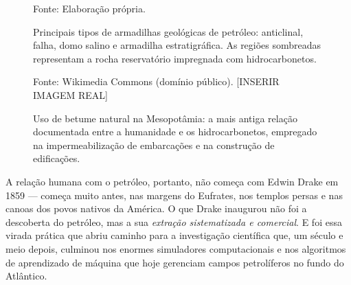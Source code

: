 \documentclass[
  12pt,
  a4paper,
  oneside,
  brazilian,
  sumario=tradicional
]{abntex2}
\renewcommand{\fonte}[1]{\vspace{2pt}\par\noindent\footnotesize Fonte: #1}
\begin{document}
\begin{figure}[H]
  \caption{Principais tipos de armadilhas geológicas de petróleo: anticlinal, falha, domo salino e armadilha estratigráfica. As regiões sombreadas representam a rocha reservatório impregnada com hidrocarbonetos.}
  \label{fig:armadilhas}
  \fonte{Elaboração própria.}
\end{figure}

\begin{figure}[H]
  \centering
  \caption{Uso de betume natural na Mesopotâmia: a mais antiga relação documentada entre a humanidade e os hidrocarbonetos, empregado na impermeabilização de embarcações e na construção de edificações.}
  \label{fig:betume}
  \fonte{Wikimedia Commons (domínio público). [INSERIR IMAGEM REAL]}
\end{figure}

A relação humana com o petróleo, portanto, não começa com Edwin Drake
em 1859 — começa muito antes, nas margens do Eufrates, nos templos
persas e nas canoas dos povos nativos da América. O que Drake inaugurou
não foi a descoberta do petróleo, mas a sua \textit{extração
sistematizada e comercial}. E foi essa virada prática que abriu caminho
para a investigação científica que, um século e meio depois, culminou
nos enormes simuladores computacionais e nos algoritmos de aprendizado
de máquina que hoje gerenciam campos petrolíferos no fundo do Atlântico.
\end{document}

